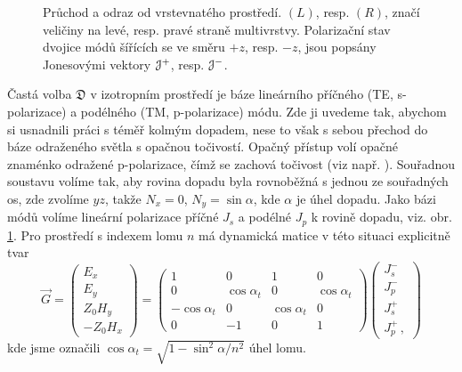 \begin{figure}
    \centering
    
    \caption{Průchod a odraz od vrstevnatého prostředí. $(L)$, resp. $(R)$, značí veličiny na levé, resp. pravé straně multivrstvy. Polarizační stav dvojice módů šířících se ve směru $+z$, resp. $-z$, jsou popsány Jonesovými vektory $\mathcal{J}^+$, resp. $\mathcal{J}^-$.}
    \label{fig:odraz-pruchod}
\end{figure}

Častá volba $\mathfrak{D}$ v izotropním prostředí je báze lineárního příčného (TE, s-polarizace) a podélného (TM, p-polarizace) módu.
Zde ji uvedeme tak, abychom si usnadnili práci s téměř kolmým dopadem, nese to však s sebou přechod do báze odraženého světla s opačnou točivostí.
Opačný přístup volí opačné znaménko odražené p-polarizace, čímž se zachová točivost (viz např. \cite{silberQuadraticMagnetoopticKerr2019a}).
Souřadnou soustavu volíme tak, aby rovina dopadu byla rovnoběžná s jednou ze souřadných os, zde zvolíme $yz$, takže $N_x=0$, $N_y=\sin \alpha$, kde $\alpha$ je úhel dopadu.
Jako bázi módů volíme lineární polarizace příčné $J_s$ a podélné $J_p$ k rovině dopadu, viz. obr. \ref{fig:odraz-pruchod}.
Pro prostředí s indexem lomu $n$ má dynamická matice v této situaci explicitně tvar
\begin{equation}
    \vec{G} = \begin{pmatrix} E_x \\ E_y \\ Z_0 H_y \\ -Z_0 H_x \end{pmatrix}
    =\begin{pmatrix}
        1 & 0 & 1 & 0 \\
        0 & \cos\alpha_t & 0 & \cos\alpha_t \\
        -\cos\alpha_t & 0 & \cos\alpha_t & 0 \\
        0 & -1 & 0 & 1
    \end{pmatrix}
    \begin{pmatrix}
        J^-_{s} \\ J^-_{p} \\ J^+_s \\ J^+_{p} \,,
    \end{pmatrix}
\end{equation}
kde jsme označili $\cos \alpha_t = \sqrt{1-\sin^2 \alpha /n^2}$ úhel lomu.

